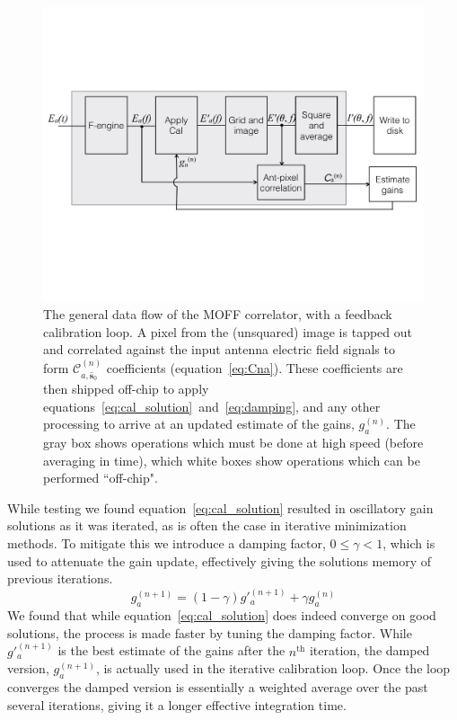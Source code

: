 \documentclass[a4paper,fleqn,usenatbib]{mnras}
\newcommand{\spix}{\ensuremath{\hat{\mathbf{s}}_{0}}}
\newcommand{\Cna}[1][n]{\ensuremath{\mathcal{C}^{(#1)}_{a,\spix}}}
\newcommand{\damp}{\ensuremath{\gamma}}
\begin{document}
\begin{figure}
\begin{center}
\includegraphics[width=\columnwidth]{fig2.pdf}
\caption{The general data flow of the MOFF correlator, with a feedback calibration loop. A pixel 
from the (unsquared) image is tapped out and correlated against the input antenna electric field 
signals to form $\Cna$ coefficients (equation~\ref{eq:Cna}). These coefficients are then 
shipped off-chip to apply equations~\ref{eq:cal_solution}~and~\ref{eq:damping}, and any other 
processing to arrive at an updated estimate of the gains, $g^{(n)}_a$. The gray box shows 
operations which must be done at high speed (before averaging in time), which white boxes 
show operations which can be performed ``off-chip".}
\label{fig:schematic}
\end{center}
\end{figure}

While testing we found equation~\ref{eq:cal_solution} resulted in oscillatory gain solutions as it 
was iterated, as is often the case in iterative minimization methods. To mitigate this we 
introduce a damping factor, $0 \leq \damp <1$, which is used to attenuate the gain update, 
effectively giving the solutions memory of previous iterations.
\begin{equation}\label{eq:damping}
g^{(n+1)}_a = (1-\damp) g'^{(n+1)}_a + \damp g^{(n)}_a
\end{equation}
We found that while equation~\ref{eq:cal_solution} does indeed converge on good solutions, 
the process is made faster by tuning the damping factor. While $g'^{(n+1)}_a$ is the best 
estimate of the gains after the $n^{\textrm{th}}$ iteration, the damped version, $g^{(n+1)}_a$, is 
actually used in the iterative calibration loop. Once the loop converges the damped version is 
essentially a weighted average over the past several iterations, giving it a longer effective 
integration time. 
\end{document}

